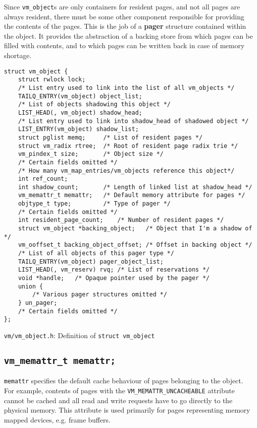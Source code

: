 \documentclass[shortabstract, english]{iithesis}
\begin{document}
Since \texttt{vm_object}s are only containers for resident pages, and not
all pages are always resident, there must be some other component responsible
for providing the contents of the pages. This is the job of a \textbf{pager}
structure contained within the object. It provides the abstraction of a backing
store from which pages can be filled with contents, and to which pages can be
written back in case of memory shortage.

\begin{listing}[H]
\begin{verbatim}
struct vm_object {
    struct rwlock lock;
    /* List entry used to link into the list of all vm_objects */
    TAILQ_ENTRY(vm_object) object_list;
    /* List of objects shadowing this object */
    LIST_HEAD(, vm_object) shadow_head;
    /* List entry used to link into shadow_head of shadowed object */
    LIST_ENTRY(vm_object) shadow_list;
    struct pglist memq;     /* List of resident pages */
    struct vm_radix rtree;  /* Root of resident page radix trie */
    vm_pindex_t size;       /* Object size */
    /* Certain fields omitted */
    /* How many vm_map_entries/vm_objects reference this object*/
    int ref_count;
    int shadow_count;       /* Length of linked list at shadow_head */
    vm_memattr_t memattr;   /* Default memory attribute for pages */
    objtype_t type;         /* Type of pager */
    /* Certain fields omitted */
    int resident_page_count;    /* Number of resident pages */
    struct vm_object *backing_object;   /* Object that I'm a shadow of */
    vm_ooffset_t backing_object_offset; /* Offset in backing object */
    /* List of all objects of this pager type */
    TAILQ_ENTRY(vm_object) pager_object_list;
    LIST_HEAD(, vm_reserv) rvq; /* List of reservations */
    void *handle;   /* Opaque pointer used by the pager */
    union {
        /* Various pager structures omitted */
    } un_pager;
    /* Certain fields omitted */
};
\end{verbatim}
\caption{\texttt{vm/vm\_object.h}: Definition of \texttt{struct vm_object}}
\end{listing}

\subsection*{\texttt{vm_memattr_t memattr;}}

\texttt{memattr} specifies the default cache behaviour of pages belonging
to the object. For example, contents of pages with the
\texttt{VM_MEMATTR_UNCACHEABLE} attribute cannot be cached and all read
and write requests have to go directly to the physical memory. This attribute is used
primarily for pages representing memory mapped devices, e.g. frame buffers.
\end{document}
